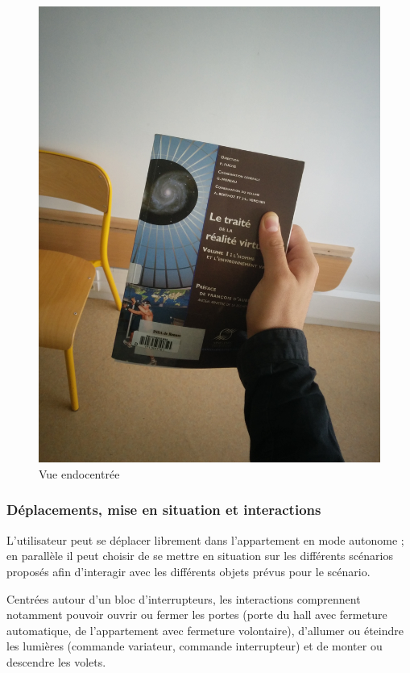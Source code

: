 \begin{figure}[h]
\begin{minipage}[b]{0.3\textwidth}
		\includegraphics[width=\linewidth]{1-PreEtude/img/vue_fps}
		\caption{Vue endocentrée}
	\end{minipage}
\end{figure}
\subsubsection{Déplacements, mise en situation et interactions}

L'utilisateur peut se déplacer librement dans l'appartement en mode autonome ; en parallèle il peut choisir de se mettre en situation sur les différents scénarios proposés afin d'interagir avec les différents objets prévus pour le scénario.

Centrées autour d'un bloc d'interrupteurs, les interactions comprennent notamment pouvoir ouvrir ou fermer les portes (porte du hall avec fermeture automatique, de l'appartement avec fermeture volontaire), d'allumer ou éteindre les lumières (commande variateur, commande interrupteur) et de monter ou descendre les volets.


